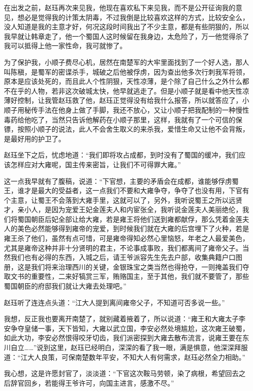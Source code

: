在出发之前，赵珏再次来见我，他现在喜欢私下来见我，而不是公开征询我的意见，想必是觉得我的计策太阴毒，不过我倒是比较喜欢这样的方式，比较安全么，没人知道是我的主意才好，何况这段时间我出了不少主意，都是有些阴狠的，所以我早就让韩章走了，他一个蜀国人这时候留在我身边，太危险了，万一他觉得杀了我可以抵得上他一家性命，我可就惨了。

为了保护我，小顺子费尽心机，居然在南楚军的大牢里面找到了一个好人选，那人叫陈稹，是蜀军的密谍杀手，城破之后他被俘虏，因为查出他多次行刺我军将领，原本是应该处死的，而且此人个性阴狠，天性凉薄，是个除了自己什么之外什么都不在乎的人物，若非这次破城太快，他早就逃走了。但是小顺子就是看中他天性凉薄好控制，让我管赵珏救了他，赵珏正觉得没有给我什么报答，所以就答应了，小顺子用秘传手法在他身上做了手脚，我还不放心，又让小顺子把我配制的一种慢性毒药给他吃了，当然只告诉他解药在小顺子那里，这样，我就有了一个可信的保镖，按照小顺子的说法，此人不会舍生取义的来杀我，爱惜生命又让他不会背叛，是最好用的护卫了。

赵珏坐下之后，忧虑地道：“我们即将攻占成都，到时没有了蜀国的缓冲，我们应该怎样应对大雍呢，国主传来密旨，让我们不可得罪大雍。”

这一点我早就有了腹稿，说道：“下官想，主要的矛盾会在成都，谁能够俘虏蜀王，谁才是最大的受益者，这一点我们不要和大雍争夺，争夺了也没有用，下官有个主意，让蜀王不会落到大雍手里，这就可以了，另外，我听说蜀王之所以远贤才，亲小人，是因为宠爱王妃金莲夫人和内宦张全，我听说金莲夫人美丽绝伦，我们将蜀国朝臣后妃全部让给大雍，若是雍王将他们送到雍都献俘，那么凭着金莲夫人的美色必然能够得到雍帝的宠爱，到时候我们就在大雍的后宫埋下了火种，若是雍王杀了他们，虽然有点可惜，可是雍帝得知必然心里恼怒，年老之人最爱美色，尤其是雍帝这种并非十分贤明的君主，不论事成事败，我们都离间了雍帝父子。当然我们也有必得的东西，入城之后，请王爷派容先生先去户部，收集典籍户口图册，这是我们将来治理西川的关键，金银珠宝之类当然也得抢夺，一则掩盖我们夺取文书的重要性，二来好犒赏三军，贿赂国主，至于其他，我们就不要管了，那些蜀国朝臣的府邸我们就让大雍去处理吧。”

赵珏听了连连点头道：“江大人提到离间雍帝父子，不知道可否多说一些。”

我想，反正我也要离开南楚了，就别藏着掖着了，所以说道：“雍王和大雍太子李安争夺皇储一事，天下皆知，大雍以武立国，李安必然处境尴尬，这次雍王破蜀，如此大功，李安必然恨得咬牙切齿，我们派密探到大雍去散布流言，说雍王要在东川自立……”说到这里，赵珏已经明白，深深的看了我一眼，满是惧意，他深深拜服道：“江大人良策，可保南楚数年平安，不知大人有何需求，赵珏必然全力相助。”

我心想，这是许愿封官了，淡淡道：“下官这次鞍马劳顿，染了病根，希望回去之后辞官回乡，若能得王爷许可，向国主进言，感激不尽。”

